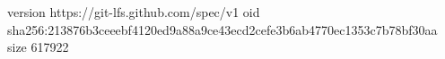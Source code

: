 version https://git-lfs.github.com/spec/v1
oid sha256:213876b3ceeebf4120ed9a88a9ce43ecd2cefe3b6ab4770ec1353c7b78bf30aa
size 617922
